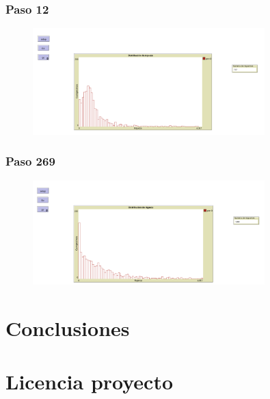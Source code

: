 \documentclass[17pt, t, lualatex]{beamer}
\begin{document}
\begin{frame}
  \frametitle{Paso 12}
  \begin{figure}[ht]
    \centering
    \includegraphics[width = 0.8\textwidth]{img/img7.png}
  \end{figure}
\end{frame}


\begin{frame}
  \frametitle{Paso 269}
  \begin{figure}[ht]
    \centering
    \includegraphics[width = 0.8\textwidth]{img/img8.png}
  \end{figure}
\end{frame}




\section{Conclusiones}

\insertsectionpage






\section{Licencia proyecto}

\insertsectionpage
\end{document}
